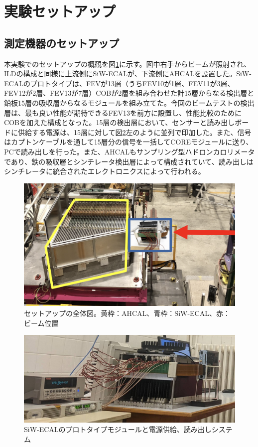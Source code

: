 \section{実験セットアップ}
\subsection{測定機器のセットアップ}
本実験でのセットアップの概観を図\ref{setup1}に示す。図中右手からビームが照射され、ILDの構成と同様に上流側にSiW-ECALが、下流側にAHCALを設置した。SiW-ECALのプロトタイプは、FEVが13層（うちFEV10が1層、FEV11が3層、FEV12が2層、FEV13が7層）COBが2層を組み合わせた計15層からなる検出層と鉛板15層の吸収層からなるモジュールを組み立てた。今回のビームテストの検出層は、最も良い性能が期待できるFEV13を前方に設置し、性能比較のためにCOBを加えた構成となった。15層の検出層において、センサーと読み出しボードに供給する電源は、15層に対して図\ref{setup2}左のように並列で印加した。また、信号はカプトンケーブルを通して15層分の信号を一括してCOREモジュールに送り、PCで読み出しを行った。また、AHCALもサンプリング型ハドロンカロリメータであり、鉄の吸収層とシンチレータ検出層によって構成されていて、読み出しはシンチレータに統合されたエレクトロニクスによって行われる。
\begin{figure}[H]
\begin{center}
 \includegraphics[keepaspectratio, scale=0.3]
 	{Figure/Beamtest/setup1.png}
 		\caption[セットアップの全体図]{セットアップの全体図。黄枠：AHCAL、青枠：SiW-ECAL、赤：ビーム位置}
		\label{setup1}
		\end{center}
\end{figure}

\begin{figure}[H]
\begin{center}
 \includegraphics[keepaspectratio, scale=0.2]
 	{Figure/Beamtest/setup2.png}
 		\caption{SiW-ECALのプロトタイプモジュールと電源供給、読み出しシステム}
		\label{setup2}
\end{center}
\end{figure}

